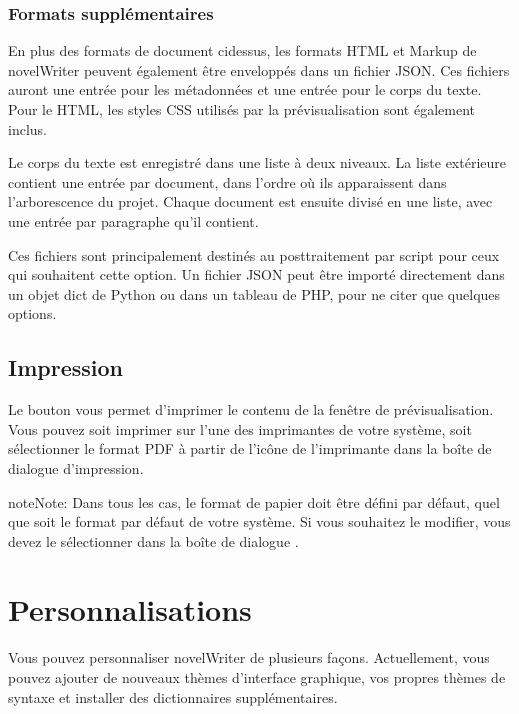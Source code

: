 \documentclass[a4paper,11pt,french]{sphinxmanual}
\begin{document}
\subsection{Formats supplémentaires}
\label{\detokenize{project_manuscript:additional-formats}}
\sphinxAtStartPar
En plus des formats de document ci\sphinxhyphen{}dessus, les formats HTML et Markup de novelWriter peuvent également être enveloppés dans un fichier JSON. Ces fichiers auront une entrée pour les métadonnées et une entrée pour le corps du texte. Pour le HTML, les styles CSS utilisés par la prévisualisation sont également inclus.

\sphinxAtStartPar
Le corps du texte est enregistré dans une liste à deux niveaux. La liste extérieure contient une entrée par document, dans l’ordre où ils apparaissent dans l’arborescence du projet. Chaque document est ensuite divisé en une liste, avec une entrée par paragraphe qu’il contient.

\sphinxAtStartPar
Ces fichiers sont principalement destinés au post\sphinxhyphen{}traitement par script pour ceux qui souhaitent cette option. Un fichier JSON peut être importé directement dans un objet dict de Python ou dans un tableau de PHP, pour ne citer que quelques options.


\section{Impression}
\label{\detokenize{project_manuscript:printing}}\label{\detokenize{project_manuscript:a-manuscript-print}}
\sphinxAtStartPar
Le bouton  vous permet d’imprimer le contenu de la fenêtre de prévisualisation. Vous pouvez soit imprimer sur l’une des imprimantes de votre système, soit sélectionner le format PDF à partir de l’icône de l’imprimante dans la boîte de dialogue d’impression.

\begin{sphinxadmonition}{note}{Note:}
\sphinxAtStartPar
Dans tous les cas, le format de papier doit être défini par défaut, quel que soit le format par défaut de votre système. Si vous souhaitez le modifier, vous devez le sélectionner dans la boîte de dialogue .
\end{sphinxadmonition}

\sphinxstepscope


\chapter{Personnalisations}
\label{\detokenize{more_customise:customisations}}\label{\detokenize{more_customise:a-custom}}\label{\detokenize{more_customise::doc}}
\sphinxAtStartPar
Vous pouvez personnaliser novelWriter de plusieurs façons. Actuellement, vous pouvez ajouter de nouveaux thèmes d’interface graphique, vos propres thèmes de syntaxe et installer des dictionnaires supplémentaires.
\end{document}
